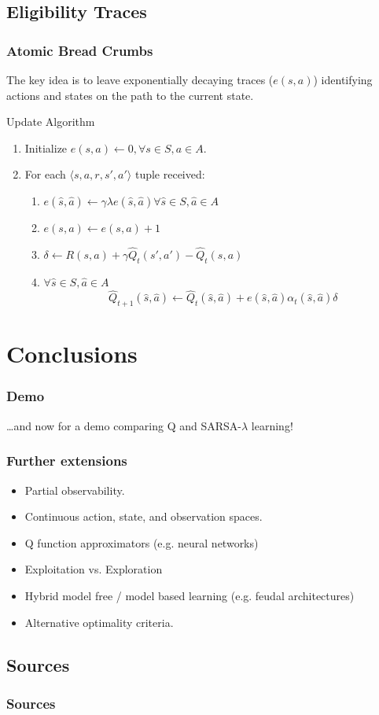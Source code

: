 \documentclass[ignorenonframetext]{beamer}
\begin{document}
\subsection{Eligibility Traces}
\begin{frame}
	\frametitle{Atomic Bread Crumbs}	
	The key idea is to leave exponentially decaying traces ($e(s,a)$)
	identifying actions and states on the path to the current state.
	\begin{block}{Update Algorithm}
		\begin{enumerate}
			\item Initialize $e(s,a) \leftarrow 0, \forall s\in S, a\in A$.
			\item For each $\langle s,a,r,s',a'\rangle$ tuple received:
				\begin{enumerate}
					\item $e(\hat s,\hat a) \leftarrow \gamma\lambda e(\hat
						s,\hat a) \forall \hat s \in S, \hat a \in A$
					\item $e(s,a) \leftarrow e(s,a) + 1$
					\item $\delta \leftarrow R(s,a) + \gamma \hat{Q}_t(s',a') -
						\hat{Q}_t(s,a)$
					\item $\forall \hat s \in S, \hat a \in A$
						\[
						\hat{Q}_{t+1}(\hat s,\hat a) \leftarrow \hat{Q}_t(\hat
						s,\hat a) +
						e(\hat s, \hat a) \alpha_t(\hat s,\hat a)\delta
						\]
				\end{enumerate}
		\end{enumerate}
	\end{block}
\end{frame}

\section{Conclusions}
\begin{frame}
	\frametitle{Demo}
	\dots and now for a demo comparing Q and SARSA-$\lambda$ learning!
\end{frame}

\begin{frame}
	\frametitle{Further extensions}
	\begin{itemize}
		\item Partial observability.
		\item Continuous action, state, and observation spaces.
		\item Q function approximators (e.g. neural networks)
		\item Exploitation vs. Exploration
		\item Hybrid model free / model based learning (e.g. feudal
			architectures)
		\item Alternative optimality criteria.
	\end{itemize}
\end{frame}

\subsection{Sources}
\begin{frame}[allowframebreaks]
	\frametitle{Sources}
	\nocite{*}
	
\end{frame}
\end{document}
